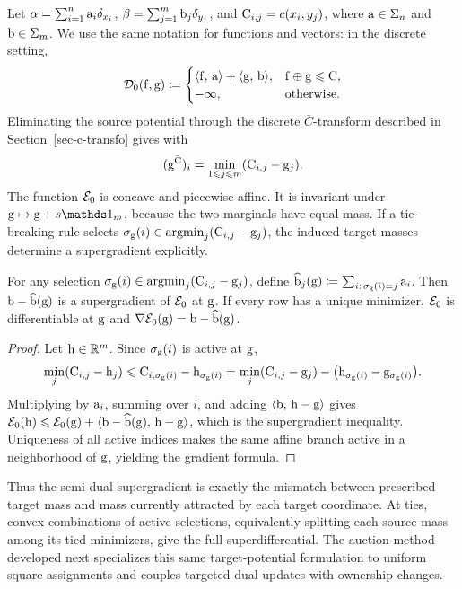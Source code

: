 Let $\alpha=\sum_{i=1}^n\mathrm{a}_i\delta_{x_i}$,
$\beta=\sum_{j=1}^m\mathrm{b}_j\delta_{y_j}$, and $\mathrm{C}_{i,j}=c(x_i,y_j)$,
where $\mathrm{a}\in\Sigma_n$ and $\mathrm{b}\in\Sigma_m$. We use the same notation for functions and vectors: in the discrete setting,
\[
	\mathcal{D}_0(\mathrm{f},\mathrm{g})
	\coloneqq
	\begin{cases}
		\langle \mathrm{f},\,\mathrm{a}\rangle+\langle \mathrm{g},\,\mathrm{b}\rangle,
		& \mathrm{f}\oplus\mathrm{g}\leqslant\mathrm{C},\\
		-\infty, & \text{otherwise}.
	\end{cases}
\]
Eliminating the source potential through the discrete $\bar C$-transform described in Section~\ref{sec-c-transfo} gives
with
\[
	(\mathrm{g}^{\bar{\mathrm{C}}})_i
	=
	\min_{1\leqslant j\leqslant m}(\mathrm{C}_{i,j}-\mathrm{g}_j).
\]
The function $\mathcal{E}_0$ is concave and piecewise affine. It is invariant under $\gD\mapsto\gD+s\ones_m$, because the two marginals have equal mass. If a tie-breaking rule selects $\sigma_{\mathrm{g}}(i)\in\operatorname{argmin}_j(\mathrm{C}_{i,j}-\mathrm{g}_j)$, the induced target masses determine a supergradient explicitly.

\begin{prop}\label{prop-discrete-semidual-supergradient}
	For any selection $\sigma_{\mathrm{g}}(i)\in\operatorname{argmin}_j(\mathrm{C}_{i,j}-\mathrm{g}_j)$, define $\widehat{\mathrm{b}}_j(\mathrm{g})\coloneqq\sum_{i:\,\sigma_{\mathrm{g}}(i)=j}\mathrm{a}_i$. Then $\mathrm{b}-\widehat{\mathrm{b}}(\mathrm{g})$ is a supergradient of $\mathcal{E}_0$ at $\mathrm{g}$. If every row has a unique minimizer, $\mathcal{E}_0$ is differentiable at $\mathrm{g}$ and $\nabla\mathcal{E}_0(\mathrm{g})=\mathrm{b}-\widehat{\mathrm{b}}(\mathrm{g})$.
\end{prop}
\begin{proof}
	Let $\mathrm{h}\in\mathbb{R}^m$. Since $\sigma_{\mathrm{g}}(i)$ is active at $\mathrm{g}$,
	\[
		\min_j(\mathrm{C}_{i,j}-\mathrm{h}_j)
		\leqslant
		\mathrm{C}_{i,\sigma_{\mathrm{g}}(i)}-\mathrm{h}_{\sigma_{\mathrm{g}}(i)}
		=
		\min_j(\mathrm{C}_{i,j}-\mathrm{g}_j)
		-\bigl(\mathrm{h}_{\sigma_{\mathrm{g}}(i)}-\mathrm{g}_{\sigma_{\mathrm{g}}(i)}\bigr).
	\]
	Multiplying by $\mathrm{a}_i$, summing over $i$, and adding $\langle \mathrm{b},\,\mathrm{h}-\mathrm{g}\rangle$ gives $\mathcal{E}_0(\mathrm{h})\leqslant\mathcal{E}_0(\mathrm{g})+\langle \mathrm{b}-\widehat{\mathrm{b}}(\mathrm{g}),\,\mathrm{h}-\mathrm{g}\rangle$, which is the supergradient inequality. Uniqueness of all active indices makes the same affine branch active in a neighborhood of $\mathrm{g}$, yielding the gradient formula.
\end{proof}

Thus the semi-dual supergradient is exactly the mismatch between prescribed target mass and mass currently attracted by each target coordinate. At ties, convex combinations of active selections, equivalently splitting each source mass among its tied minimizers, give the full superdifferential. The auction method developed next specializes this same target-potential formulation to uniform square assignments and couples targeted dual updates with ownership changes.

